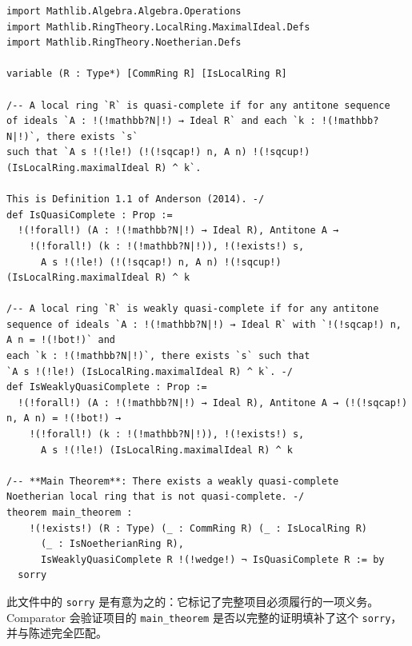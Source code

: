\begin{Verbatim}[fontsize=\small,commandchars=!?\|]
import Mathlib.Algebra.Algebra.Operations
import Mathlib.RingTheory.LocalRing.MaximalIdeal.Defs
import Mathlib.RingTheory.Noetherian.Defs

variable (R : Type*) [CommRing R] [IsLocalRing R]

/-- A local ring `R` is quasi-complete if for any antitone sequence
of ideals `A : !(!mathbb?N|!) → Ideal R` and each `k : !(!mathbb?N|!)`, there exists `s`
such that `A s !(!le!) (!(!sqcap!) n, A n) !(!sqcup!) (IsLocalRing.maximalIdeal R) ^ k`.

This is Definition 1.1 of Anderson (2014). -/
def IsQuasiComplete : Prop :=
  !(!forall!) (A : !(!mathbb?N|!) → Ideal R), Antitone A →
    !(!forall!) (k : !(!mathbb?N|!)), !(!exists!) s,
      A s !(!le!) (!(!sqcap!) n, A n) !(!sqcup!) (IsLocalRing.maximalIdeal R) ^ k

/-- A local ring `R` is weakly quasi-complete if for any antitone
sequence of ideals `A : !(!mathbb?N|!) → Ideal R` with `!(!sqcap!) n, A n = !(!bot!)` and
each `k : !(!mathbb?N|!)`, there exists `s` such that
`A s !(!le!) (IsLocalRing.maximalIdeal R) ^ k`. -/
def IsWeaklyQuasiComplete : Prop :=
  !(!forall!) (A : !(!mathbb?N|!) → Ideal R), Antitone A → (!(!sqcap!) n, A n) = !(!bot!) →
    !(!forall!) (k : !(!mathbb?N|!)), !(!exists!) s,
      A s !(!le!) (IsLocalRing.maximalIdeal R) ^ k

/-- **Main Theorem**: There exists a weakly quasi-complete
Noetherian local ring that is not quasi-complete. -/
theorem main_theorem :
    !(!exists!) (R : Type) (_ : CommRing R) (_ : IsLocalRing R)
      (_ : IsNoetherianRing R),
      IsWeaklyQuasiComplete R !(!wedge!) ¬ IsQuasiComplete R := by
  sorry
\end{Verbatim}
\noindent 此文件中的 \texttt{sorry} 是有意为之的：它标记了完整项目必须履行的一项义务。Comparator 会验证项目的 \texttt{main\_theorem} 是否以完整的证明填补了这个 \texttt{sorry}，并与陈述完全匹配。
\let\clearpage\relax

